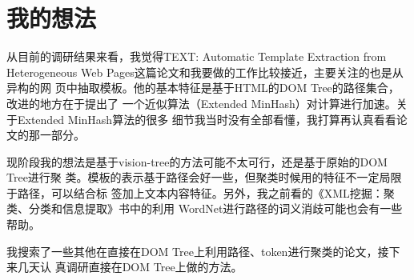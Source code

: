 \documentclass[a4paper]{article}
\begin{document}
\section{我的想法}
\label{sec-2}

  从目前的调研结果来看，我觉得TEXT: Automatic Template Extraction from
  Heterogeneous Web Pages这篇论文和我要做的工作比较接近，主要关注的也是从异构的网
  页中抽取模板。他的基本特征是基于HTML的DOM Tree的路径集合，改进的地方在于提出了
  一个近似算法（Extended MinHash）对计算进行加速。关于Extended MinHash算法的很多
  细节我当时没有全部看懂，我打算再认真看看论文的那一部分。

  现阶段我的想法是基于vision-tree的方法可能不太可行，还是基于原始的DOM Tree进行聚
  类。模板的表示基于路径会好一些，但聚类时候用的特征不一定局限于路径，可以结合标
  签加上文本内容特征。另外，我之前看的《XML挖掘：聚类、分类和信息提取》书中的利用
  WordNet进行路径的词义消歧可能也会有一些帮助。

  我搜索了一些其他在直接在DOM Tree上利用路径、token进行聚类的论文，接下来几天认
  真调研直接在DOM Tree上做的方法。
\end{document}
